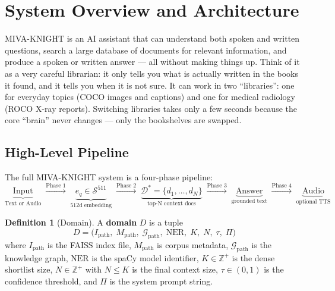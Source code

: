 \documentclass[12pt,a4paper]{article}
\theoremstyle{definition}
\newtheorem{definition}{Definition}[section]
\theoremstyle{plain}
\theoremstyle{remark}
\newcommand{\Sph}{\mathcal{S}}
\newcommand{\KG}{\mathcal{G}}
\begin{document}
\tableofcontents
\newpage

\section{System Overview and Architecture}

\begin{tcolorbox}[laymanbox]
MIVA-KNIGHT is an AI assistant that can understand both spoken and written questions,
search a large database of documents for relevant information, and produce a spoken
or written answer — all without making things up. Think of it as a very careful
librarian: it only tells you what is actually written in the books it found,
and it tells you when it is not sure. It can work in two ``libraries'': one for
everyday topics (COCO images and captions) and one for medical radiology (ROCO
X-ray reports). Switching libraries takes only a few seconds because the core
``brain'' never changes — only the bookshelves are swapped.
\end{tcolorbox}

\subsection{High-Level Pipeline}

The full MIVA-KNIGHT system is a four-phase pipeline:
\[
  \underbrace{\text{Input}}_{\text{Text or Audio}}
  \;\xrightarrow{\text{Phase 1}}\;
  \underbrace{e_q \in \Sph^{511}}_{\text{512d embedding}}
  \;\xrightarrow{\text{Phase 2}}\;
  \underbrace{\mathcal{D}^* = \{d_1,\ldots,d_N\}}_{\text{top-N context docs}}
  \;\xrightarrow{\text{Phase 3}}\;
  \underbrace{\text{Answer}}_{\text{grounded text}}
  \;\xrightarrow{\text{Phase 4}}\;
  \underbrace{\text{Audio}}_{\text{optional TTS}}
\]

\begin{definition}[Domain]
A \textbf{domain} $D$ is a tuple
\[
  D = \bigl(I_{\mathrm{path}},\; M_{\mathrm{path}},\; \KG_{\mathrm{path}},\; \text{NER},\; K,\; N,\; \tau,\; \Pi\bigr)
\]
where $I_{\mathrm{path}}$ is the FAISS index file, $M_{\mathrm{path}}$ is corpus metadata,
$\KG_{\mathrm{path}}$ is the knowledge graph, $\text{NER}$ is the spaCy model identifier,
$K \in \mathbb{Z}^+$ is the dense shortlist size, $N \in \mathbb{Z}^+$ with $N \le K$
is the final context size, $\tau \in (0,1)$ is the confidence threshold, and $\Pi$
is the system prompt string.
\end{definition}
\end{document}
